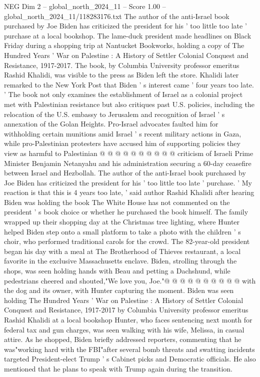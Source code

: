 \begin{textsample}{NEG Dim 2 – global\_north\_2024\_11 – Score 1.00 – global\_north\_2024\_11/118283176.txt}  \label{ex:f2_neg_091}
The author of the anti-Israel book purchased by Joe Biden has criticized the president for his ' too little too late ' purchase at a local bookshop.
The lame-duck president made headlines on Black Friday during a shopping trip at Nantucket Bookworks, holding a copy of The Hundred Years ' War on Palestine : A History of Settler Colonial Conquest and Resistance, 1917-2017.
The book, by Columbia University professor emeritus Rashid Khalidi, was visible to the press as Biden left the store.
Khalidi later remarked to the New York Post that Biden ' s interest came ' four years too late. ' The book not only examines the establishment of Israel as a colonial project met with Palestinian resistance but also critiques past U.S. policies, including the relocation of the U.S. embassy to Jerusalem and recognition of Israel ' s annexation of the Golan Heights.
Pro-Israel advocates faulted him for withholding certain munitions amid Israel ' s recent military actions in Gaza, while pro-Palestinian protesters have accused him of supporting policies they view as harmful to Palestinian @ @ @ @ @ @ @ @ @ @ criticism of Israeli Prime Minister Benjamin Netanyahu and his administration securing a 60-day ceasefire between Israel and Hezbollah.
The author of the anti-Israel book purchased by Joe Biden has criticized the president for his ' too little too late ' purchase. ' My reaction is that this is 4 years too late, ' said author Rashid Khalidi after hearing Biden was holding the book The White House has not commented on the president ' s book choice or whether he purchased the book himself.
The family wrapped up their shopping day at the Christmas tree lighting, where Hunter helped Biden step onto a small platform to take a photo with the children ' s choir, who performed traditional carols for the crowd.
The 82-year-old president began his day with a meal at The Brotherhood of Thieves restaurant, a local favorite in the exclusive Massachusetts enclave.
Biden, strolling through the shops, was seen holding hands with Beau and petting a Dachshund, while pedestrians cheered and shouted,"We love you, Joe."@ @ @ @ @ @ @ @ @ @ with the dog and its owner, with Hunter capturing the moment.
Biden was seen holding The Hundred Years ' War on Palestine : A History of Settler Colonial Conquest and Resistance, 1917-2017 by Columbia University professor emeritus Rashid Khalidi at a local bookshop Hunter, who faces sentencing next month for federal tax and gun charges, was seen walking with his wife, Melissa, in casual attire.
As he shopped, Biden briefly addressed reporters, commenting that he was"working hard with the FBI"after several bomb threats and swatting incidents targeted President-elect Trump ' s Cabinet picks and Democratic officials.
He also mentioned that he plans to speak with Trump again during the transition.

\end{textsample}
